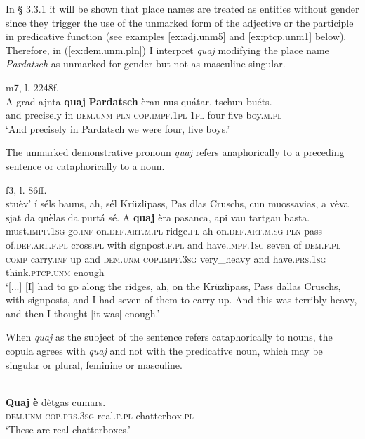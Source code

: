 In § 3.3.1 it will be shown that place names are treated as entities without gender since they trigger the use of the unmarked form of the adjective or the participle in predicative function (see examples \ref{ex:adj.unm5} and \ref{ex:ptcp.unm1} below). Therefore, in (\ref{ex:dem.unm.pln}) I interpret \textit{quaj} modifying the place name \textit{Pardatsch} as unmarked for gender but not as masculine singular.

\ea
\label{ex:dem.unm.pln}
 {m7, l. 2248f.}\\
	\gll A grad ajnta \textbf{quaj} \textbf{Pardatsch} èran nus quátar, tschun buéts.   \\
and precisely in \textsc{dem.unm} \textsc{pln} \textsc{cop.impf.1pl} \textsc{1pl} four five boy.\textsc{m.pl}\\
\glt `And precisely in Pardatsch we were four, five boys.'
\z


The unmarked demonstrative pronoun \textit{quaj} refers anaphorically to a preceding sentence or cataphorically to a noun.

\ea
\label{}
 {f3, l. 86ff.}\\
\gll [...] stuèv’ í  séls bauns, ah, sél Krüzlipass, Pas dlas Cruschs, cun muossavias, a vèva sjat da quèlas da purtá sé.  A \textbf{quaj} èra pasanca, api vau tartgau basta.  \\
{} must.\textsc{impf.1sg} go.\textsc{inf} on.\textsc{def.art.m.pl} ridge.\textsc{pl} ah on.\textsc{def.art.m.sg} \textsc{pln} pass of.\textsc{def.art.f.pl} cross.\textsc{pl} with signpost.\textsc{f.pl} and have.\textsc{impf.1sg} seven of  \textsc{dem.f.pl} \textsc{comp} carry.\textsc{inf} up and \textsc{dem.unm} \textsc{cop.impf.3sg} very\_heavy and have.\textsc{prs.1sg} think.\textsc{ptcp.unm} enough \\
\glt `[...] [I] had to go along the ridges, ah, on the Krüzlipass, Pass dallas Cruschs, with signposts, and I had seven of them to carry up. And this was terribly heavy, and then I thought [it was] enough.'
\z

When \textit{quaj} as the subject of the sentence refers cataphorically to nouns, the copula agrees with \textit{quaj} and not with the predicative noun, which may be singular or plural, feminine or masculine.

\ea
\label{ex:quaj:agrwithsubj}
\\
\gll \textbf{Quaj} \textbf{è} dètgas cumars.\\
\textsc{dem.unm} \textsc{cop.prs.3sg} real.\textsc{f.pl} chatterbox.\textsc{pl}\\
\glt `These are real chatterboxes.'
\z

